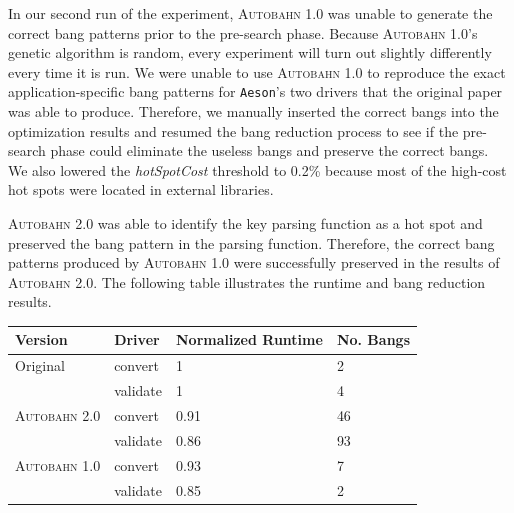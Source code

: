 \documentclass[format=sigplan, review=true]{acmart}
\newcommand{\hotspot}[0]{hot spot}
\newcommand{\hotspots}[0]{hot spots}
\newcommand{\hotspotcost}[0]{\textit{hotSpotCost}}
\newcommand{\Ao}[0]{\textsc{Autobahn 1.0}}
\newcommand{\At}[0]{\textsc{Autobahn 2.0}}
\newcommand{\preopt}[0]{pre-search}
\begin{document}


In our second run of the experiment, \Ao{} was unable to generate the correct bang patterns prior to the \preopt{} phase. Because \Ao{}'s genetic algorithm is random, every experiment will turn out slightly differently every time it is run. We were unable to use \Ao{} to reproduce the exact application-specific bang patterns for \texttt{Aeson}'s two drivers that the original paper was able to produce. Therefore, we manually inserted the correct bangs into the optimization results and resumed the bang reduction process to see if the \preopt{} phase could eliminate the useless bangs and preserve the correct bangs. We also lowered the \hotspotcost{} threshold to 0.2\% because most of the high-cost \hotspots{} were located in external libraries. 

\At{} was able to identify the key parsing function as a \hotspot{} and preserved the bang pattern in the parsing function. Therefore, the correct bang patterns produced by \Ao{} were successfully preserved in the results of \At{}. The following table illustrates the runtime and bang reduction results. 

\begin{tabular}{p{2.5cm}p{1cm}p{1.5cm}p{1.5cm}}
\hline
Version   & Driver & Normalized Runtime & No. Bangs\\
\hline
Original      & convert   & 1     & 2 \\
          & validate        & 1     &  4\\
\At{}       & convert     & 0.91     & 46\\
          & validate        & 0.86	& 93\\
\Ao{}       & convert     & 0.93     &   7 \\
          & validate        & 0.85 & 2	\\
\hline
\end{tabular}
\end{document}
